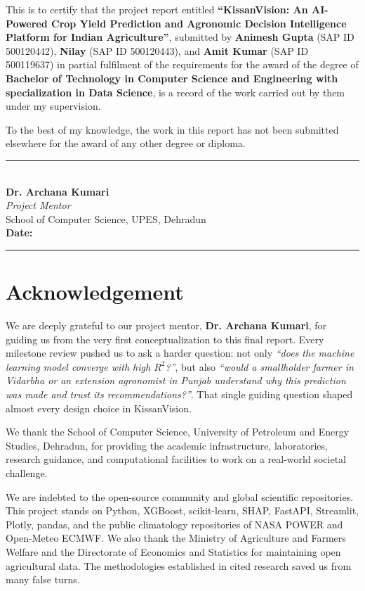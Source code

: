 \documentclass[11pt,a4paper]{report}
\begin{document}
This is to certify that the project report entitled \textbf{``KissanVision: An AI-Powered Crop Yield Prediction and Agronomic Decision Intelligence Platform for Indian Agriculture''}, submitted by \textbf{Animesh Gupta} (SAP ID 500120442), \textbf{Nilay} (SAP ID 500120443), and \textbf{Amit Kumar} (SAP ID 500119637) in partial fulfilment of the requirements for the award of the degree of \textbf{Bachelor of Technology in Computer Science and Engineering with specialization in Data Science}, is a record of the work carried out by them under my supervision.

To the best of my knowledge, the work in this report has not been submitted elsewhere for the award of any other degree or diploma.\\[35mm]

\noindent
\rule{60mm}{0.5pt}\\
\textbf{Dr. Archana Kumari}\\
\textit{Project Mentor}\\
School of Computer Science, UPES, Dehradun\\[10mm]
\textbf{Date:} \rule{40mm}{0.5pt}

\newpage

\chapter*{Acknowledgement}

We are deeply grateful to our project mentor, \textbf{Dr. Archana Kumari}, for guiding us from the very first conceptualization to this final report. Every milestone review pushed us to ask a harder question: not only \textit{``does the machine learning model converge with high $R^2$?''}, but also \textit{``would a smallholder farmer in Vidarbha or an extension agronomist in Punjab understand why this prediction was made and trust its recommendations?''}. That single guiding question shaped almost every design choice in KissanVision.

We thank the School of Computer Science, University of Petroleum and Energy Studies, Dehradun, for providing the academic infrastructure, laboratories, research guidance, and computational facilities to work on a real-world societal challenge.

We are indebted to the open-source community and global scientific repositories. This project stands on Python, XGBoost, scikit-learn, SHAP, FastAPI, Streamlit, Plotly, pandas, and the public climatology repositories of NASA POWER and Open-Meteo ECMWF. We also thank the Ministry of Agriculture and Farmers Welfare and the Directorate of Economics and Statistics for maintaining open agricultural data. The methodologies established in cited research saved us from many false turns.
\end{document}
